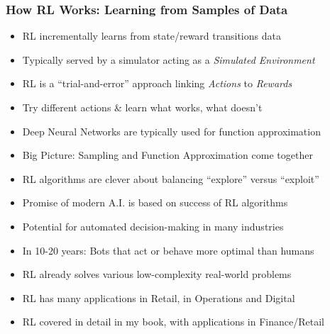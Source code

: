 \documentclass[handout]{beamer}
\begin{document}
\begin{frame}
\frametitle{How RL Works: Learning from Samples of Data}
\pause
\begin{itemize}[<+->]
\item RL incrementally learns from state/reward transitions data
\item Typically served by a simulator acting as a {\em Simulated Environment}
\item RL is a ``trial-and-error'' approach linking {\em Actions} to {\em Rewards}
\item Try different actions \& learn what works, what doesn't
\item Deep Neural Networks are typically used for function approximation
\item Big Picture: Sampling and Function Approximation come together
\item RL algorithms are clever about balancing  ``explore'' versus ``exploit''
\item Promise of modern A.I. is based on success of RL algorithms
\item Potential for automated decision-making in many industries
\item In 10-20 years: Bots that act or behave more optimal than humans
\item RL already solves various low-complexity real-world problems
\item RL has many applications in Retail, in Operations and Digital
\item RL covered in detail in my book, with applications in Finance/Retail
\end{itemize}
\end{frame}
\end{document}
